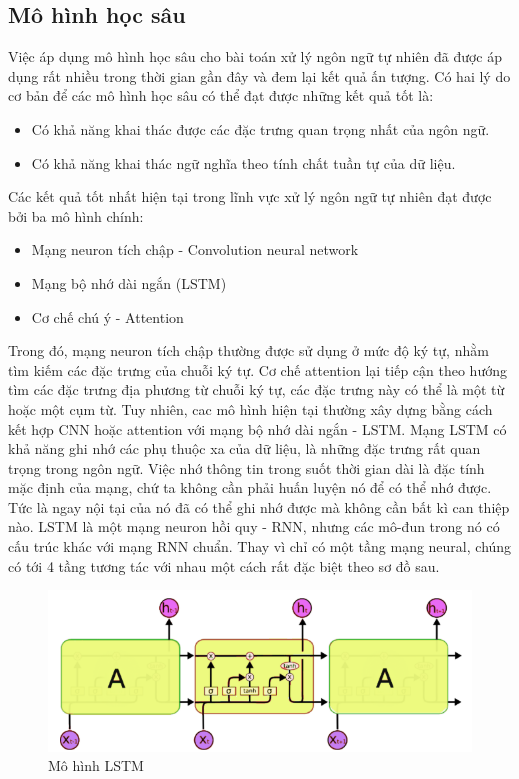 \documentclass[14pt]{extreport}
\begin{document}
\subsection{Mô hình học sâu}
Việc áp dụng mô hình học sâu cho bài toán xử lý ngôn ngữ tự nhiên đã được áp dụng rất nhiều trong thời gian gần đây và đem lại kết quả ấn tượng. Có hai lý do cơ bản để các mô hình học sâu có thể đạt được những kết quả tốt là:
\begin{itemize}
    \item Có khả năng khai thác được các đặc trưng quan trọng nhất của ngôn ngữ.
    \item Có khả năng khai thác ngữ nghĩa theo tính chất tuần tự của dữ liệu.
\end{itemize}
Các kết quả tốt nhất hiện tại trong lĩnh vực xử lý ngôn ngữ tự nhiên đạt được bởi ba mô hình chính:
\begin{itemize}
    \item Mạng neuron tích chập - Convolution neural network
    \item Mạng bộ nhớ dài ngắn (LSTM)
    \item Cơ chế chú ý - Attention
\end{itemize}
Trong đó, mạng neuron tích chập thường được sử dụng ở mức độ ký tự, nhằm tìm kiếm các đặc trưng của chuỗi ký tự. Cơ chế attention lại tiếp cận theo hướng tìm các đặc trưng địa phương từ chuỗi ký tự, các đặc trưng này có thể là một từ hoặc một cụm từ. Tuy nhiên, cac mô hình hiện tại thường xây dựng bằng cách kết hợp CNN hoặc attention với mạng bộ nhớ dài ngắn - LSTM. Mạng LSTM có khả năng ghi nhớ các phụ thuộc xa của dữ liệu, là những đặc trưng rất quan trọng trong ngôn ngữ. Việc nhớ thông tin trong suốt thời gian dài là đặc tính mặc định của mạng, chứ ta không cần phải huấn luyện nó để có thể nhớ được. Tức là ngay nội tại của nó đã có thể ghi nhớ được mà không cần bất kì can thiệp nào. LSTM là một mạng neuron hồi quy - RNN, nhưng các mô-đun trong nó có cấu trúc khác với mạng RNN chuẩn. Thay vì chỉ có một tầng mạng neural, chúng có tới 4 tầng tương tác với nhau một cách rất đặc biệt theo sơ đồ sau.
\begin{figure}[h]
    \centering
    \includegraphics{image/LSTM.png}
    \caption{Mô hình LSTM}
    \label{fig:lstm}
\end{figure}
\end{document}
